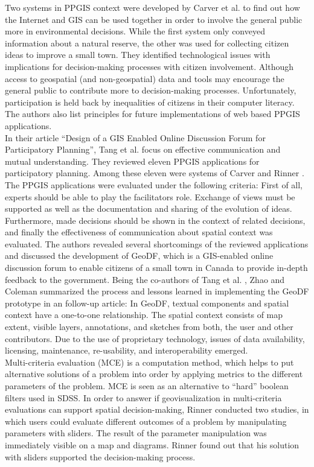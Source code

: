 Two systems in PPGIS context were developed by Carver et al. \cite{Carver2001_PPGIS_Cyberdemocracy} to find out how the Internet and GIS can be used together in order to involve the general public more in environmental decisions. While the first system only conveyed information about a natural reserve, the other was used for collecting citizen ideas to improve a small town. They identified technological issues with implications for decision-making processes with citizen involvement. Although access to geospatial (and non-geospatial) data and tools may encourage the general public to contribute more to decision-making processes. Unfortunately, participation is held back by inequalities of citizens in their computer literacy. The authors also list principles for future implementations of web based PPGIS applications.\\
In their article ``Design of a GIS Enabled Online Discussion Forum for Participatory Planning'', Tang et al. \cite{Tang2005_PPGIS_discussion_forum} focus on effective communication and mutual understanding. They reviewed eleven PPGIS applications for participatory planning. Among these eleven were systems of Carver \cite{Carver2001_PPGIS_Cyberdemocracy} and Rinner \cite{Rinner_ArgumentationMaps,Kessler2005_ArgumentationMapPrototype}. The PPGIS applications were evaluated under the following criteria: First of all, experts should be able to play the facilitators role. Exchange of views must be supported as well as the documentation and sharing of the evolution of ideas. Furthermore, made decisions should be shown in the context of related decisions, and finally the effectiveness of communication about spatial context was evaluated. The authors revealed several shortcomings of the reviewed applications and discussed the development of GeoDF, which is a GIS-enabled online discussion forum to enable citizens of a small town in Canada to provide in-depth feedback to the government. Being the co-authors of Tang et al. \cite{Tang2005_PPGIS_discussion_forum}, Zhao and Coleman \cite{zhao2006geodf} summarized the process and lessons learned in implementing the GeoDF prototype in an follow-up article: In GeoDF, textual components and spatial context have a one-to-one relationship. The spatial context consists of map extent, visible layers, annotations, and sketches from both, the user and other contributors. Due to the use of proprietary technology, issues of data availability, licensing, maintenance, re-usability, and interoperability emerged.\\
Multi-criteria evaluation (MCE) is a computation method, which helps to put alternative solutions of a problem into order by applying metrics to the different parameters of the problem. MCE is seen as an alternative to ``hard'' boolean filters used in SDSS. In order to answer if geovisualization in multi-criteria evaluations can support spatial decision-making, Rinner \cite{Rinner2007_geovis_decisionsupport} conducted two studies, in which users could evaluate different outcomes of a problem by manipulating parameters with sliders. The result of the parameter manipulation was immediately visible on a map and diagrams. Rinner found out that his solution with sliders supported the decision-making process.\\
